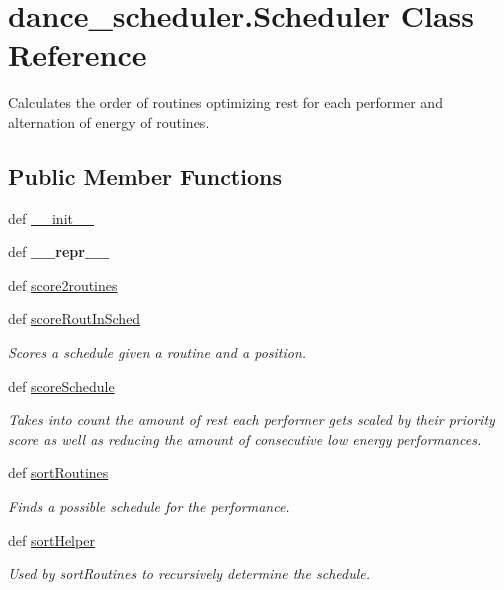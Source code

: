 \hypertarget{classdance__scheduler_1_1Scheduler}{\section{dance\-\_\-scheduler.\-Scheduler Class Reference}
\label{classdance__scheduler_1_1Scheduler}
}


Calculates the order of routines optimizing rest for each performer and alternation of energy of routines.  


\subsection*{Public Member Functions}
\begin{DoxyCompactItemize}
\item 
def \hyperlink{classdance__scheduler_1_1Scheduler_afdba752029f80f09d402165b49b6544a}{\-\_\-\-\_\-init\-\_\-\-\_\-}
\item 
\hypertarget{classdance__scheduler_1_1Scheduler_aa92e7ff34cf2efcc1689672465d22ec3}{def {\bfseries \-\_\-\-\_\-repr\-\_\-\-\_\-}}\label{classdance__scheduler_1_1Scheduler_aa92e7ff34cf2efcc1689672465d22ec3}

\item 
def \hyperlink{classdance__scheduler_1_1Scheduler_aa6f60188574feb9be8f97dfd2633025a}{score2routines}
\item 
def \hyperlink{classdance__scheduler_1_1Scheduler_ab909aba83466d0de7bdedf826740f51a}{score\-Rout\-In\-Sched}
\begin{DoxyCompactList}\small\item\em Scores a schedule given a routine and a position. \end{DoxyCompactList}\item 
def \hyperlink{classdance__scheduler_1_1Scheduler_aa3579ab4269b6c0e5a55866a7e79145d}{score\-Schedule}
\begin{DoxyCompactList}\small\item\em Takes into count the amount of rest each performer gets scaled by their priority score as well as reducing the amount of consecutive low energy performances. \end{DoxyCompactList}\item 
def \hyperlink{classdance__scheduler_1_1Scheduler_a975b54dd7d349b9ebb8b1548e07d498d}{sort\-Routines}
\begin{DoxyCompactList}\small\item\em Finds a possible schedule for the performance. \end{DoxyCompactList}\item 
def \hyperlink{classdance__scheduler_1_1Scheduler_a123b6744af9876640bd2c507872fab14}{sort\-Helper}
\begin{DoxyCompactList}\small\item\em Used by sort\-Routines to recursively determine the schedule. \end{DoxyCompactList}\end{DoxyCompactItemize}
